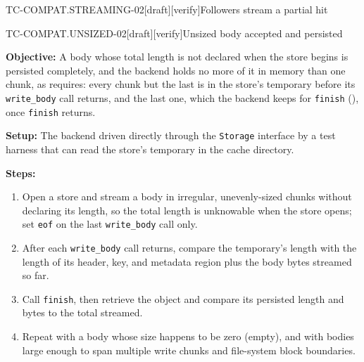 \begin{requirement}{TC-COMPAT.STREAMING-02}[draft][verify]{Followers stream a partial hit}


\end{requirement}

\begin{requirement}{TC-COMPAT.UNSIZED-02}[draft][verify]{Unsized body accepted and persisted}


  \textbf{Objective:} A body whose total length is not declared when the
  store begins is persisted completely, and the backend holds no more of it
  in memory than one chunk, as  requires:
  every chunk but the last is in the store's temporary before its
  \texttt{write\_body} call returns, and the last one, which the backend
  keeps for \texttt{finish} (), once
  \texttt{finish} returns.

  \textbf{Setup:} The backend driven directly through the \texttt{Storage}
  interface by a test harness that can read the store's temporary in the
  cache directory.

  \textbf{Steps:}
  \begin{enumerate}
    \item Open a store and stream a body in irregular, unevenly-sized chunks
      without declaring its length, so the total length is unknowable when
      the store opens; set \texttt{eof} on the last \texttt{write\_body}
      call only.
    \item After each \texttt{write\_body} call returns, compare the
      temporary's length with the length of its header, key, and metadata
      region plus the body bytes streamed so far.
    \item Call \texttt{finish}, then retrieve the object and compare its
      persisted length and bytes to the total streamed.
    \item Repeat with a body whose size happens to be zero (empty), and with
      bodies large enough to span multiple write chunks and file-system block
      boundaries.
  \end{enumerate}


\end{requirement}
